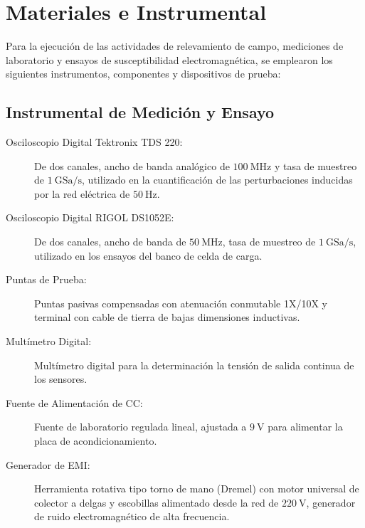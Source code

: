 \chapter{Materiales e Instrumental}

Para la ejecución de las actividades de relevamiento de campo, mediciones de laboratorio y ensayos de susceptibilidad
electromagnética, se emplearon los siguientes instrumentos, componentes y dispositivos de prueba:

\section{Instrumental de Medición y Ensayo}
\begin{description}
    \item[Osciloscopio Digital Tektronix TDS 220:] De dos canales, ancho de banda analógico de $\qty{100}{\mega\hertz}$
    y tasa de muestreo de $\qty{1}{\text{GSa/s}}$, utilizado en la cuantificación de las perturbaciones inducidas por
    la red eléctrica de $\qty{50}{\hertz}$.
    \item[Osciloscopio Digital RIGOL DS1052E:] De dos canales, ancho de banda de $\qty{50}{\mega\hertz}$, tasa de
    muestreo de $\qty{1}{\text{GSa/s}}$, utilizado en los ensayos del banco de celda de carga.
    \item[Puntas de Prueba:] Puntas pasivas compensadas con atenuación conmutable 1X/10X y terminal con cable de tierra
    de bajas dimensiones inductivas.
    \item[Multímetro Digital:] Multímetro digital para la determinación la tensión de salida continua de los sensores.
    \item[Fuente de Alimentación de CC:] Fuente de laboratorio regulada lineal, ajustada a $\qty{+9}{\volt}$ para
    alimentar la placa de acondicionamiento.
    \item[Generador de EMI:] Herramienta rotativa tipo torno de mano (Dremel) con motor universal de colector a delgas
    y escobillas alimentado desde la red de $\qty{220}{\volt}$, generador de ruido electromagnético de alta frecuencia.
\end{description}

